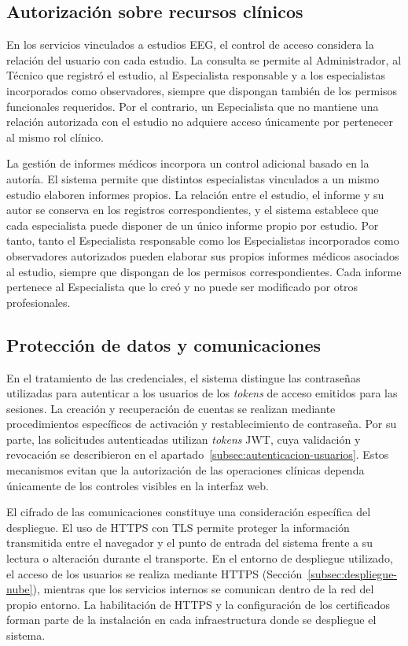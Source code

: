 \subsection{Autorización sobre recursos clínicos}
\label{subsec:autorizacion-recursos-clinicos}

En los servicios vinculados a estudios EEG, el control de acceso considera la relación del usuario con cada estudio. La consulta se permite al Administrador, al Técnico que registró el estudio, al Especialista responsable y a los especialistas incorporados como observadores, siempre que dispongan también de los permisos funcionales requeridos. Por el contrario, un Especialista que no mantiene una relación autorizada con el estudio no adquiere acceso únicamente por pertenecer al mismo rol clínico.

La gestión de informes médicos incorpora un control adicional basado en la autoría. El sistema permite que distintos especialistas vinculados a un mismo estudio elaboren informes propios. La relación entre el estudio, el informe y su autor se conserva en los registros correspondientes, y el sistema establece que cada especialista puede disponer de un único informe propio por estudio. Por tanto, tanto el Especialista responsable como los Especialistas incorporados como observadores autorizados pueden elaborar sus propios informes médicos asociados al estudio, siempre que dispongan de los permisos correspondientes. Cada informe pertenece al Especialista que lo creó y no puede ser modificado por otros profesionales.

\subsection{Protección de datos y comunicaciones}
\label{subsec:proteccion-datos-comunicaciones}

En el tratamiento de las credenciales, el sistema distingue las contraseñas utilizadas para autenticar a los usuarios de los \textit{tokens} de acceso emitidos para las sesiones. La creación y recuperación de cuentas se realizan mediante procedimientos específicos de activación y restablecimiento de contraseña. Por su parte, las solicitudes autenticadas utilizan \textit{tokens} JWT, cuya validación y revocación se describieron en el apartado~\ref{subsec:autenticacion-usuarios}. Estos mecanismos evitan que la autorización de las operaciones clínicas dependa únicamente de los controles visibles en la interfaz web.

El cifrado de las comunicaciones constituye una consideración específica del despliegue. El uso de HTTPS con TLS permite proteger la información transmitida entre el navegador y el punto de entrada del sistema frente a su lectura o alteración durante el transporte. En el entorno de despliegue utilizado, el acceso de los usuarios se realiza mediante HTTPS (Sección~\ref{subsec:despliegue-nube}), mientras que los servicios internos se comunican dentro de la red del propio entorno. La habilitación de HTTPS y la configuración de los certificados forman parte de la instalación en cada infraestructura donde se despliegue el sistema.


